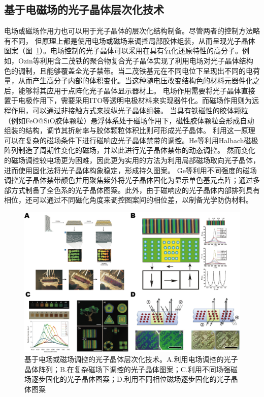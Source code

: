 \subsection{基于电磁场的光子晶体层次化技术}
\label{subsec:magnetelectro-pattern}

电场或磁场作用力也可以用于光子晶体的层次化结构制备。尽管两者的控制方法略有不同，
但原理上都是使用电场或磁场来调控局部胶体组装，从而呈现光子晶体图案（图~\ref{fig:magnet_electro_PhC}）。电场控制的光子晶体可以采用在具有氧化还原特性的高分子。例如，Ozin等利用含二茂铁的聚合物复合光子晶体实现了利用电场对光子晶体结构色的调制\cite{Arsenault2007PhotonicCrystal}，且能够覆盖全光子禁带。当二茂铁基元在不同电位下呈现出不同的电荷量，从而产生高分子内部的体积变化。当这种随电压改变结构色的材料元器件化之后，能够将其应用于点阵化光子晶体显示器材上。
电场作用需要将光子晶体直接置于电极作用下，需要采用ITO等透明电极材料来实现器件化。而磁场作用则为远程作用，可以通过非接触方式来操纵光子晶体组装。
当具有铁磁性的胶体颗粒（例如FeO@SiO胶体颗粒）悬浮体系处于磁场作用下，磁性胶体颗粒会形成自动组装的结构，调节其折射率与胶体颗粒体积比则可形成光子晶体\cite{Ge2009Magnetochromatic}。
利用这一原理可以在复杂的磁场条件下进行磁响应光子晶体禁带的调控。He等利用Halbach磁极阵列制造了周期性变化的磁场，并以此进行光子晶体禁带的动态调控\cite{He2011Assembly}。
然而变化的磁场调控较电场更为困难，因此更为实用的方法为利用局部磁场取向光子晶体，进而使用固化法将光子晶体构象稳定，形成持久图案。
Ge等利用不同强度的磁场调控光子晶体禁带颜色并用聚焦紫外将光子晶体固化为显示单色基元点阵；通过多部方式制备了全色系的光子晶体图案\cite{Kim2009Structural}。此外，由于磁响应的光子晶体内部排列具有相位，还可以通过不同磁化角度来调控图案间的相位差，以制备光学防伪材料\cite{Xuan2011Photonic}。
\begin{figure}[htbp]
	\centering
	\includegraphics[width=0.9\linewidth]{figures/magnet_electro_phC.png}
	\caption{基于电场或磁场调控的光子晶体层次化技术。A.利用电场调控的光子晶体阵列\cite{Arsenault2007PhotonicCrystal}；B.在复杂磁场下调控的光子晶体图案\cite{He2011Assembly}；C.利用不同场强磁场逐步固化的光子晶体图案\cite{Kim2009Structural}；D.利用不同相位磁场逐步固化的光子晶体图案\cite{Xuan2011Photonic}}
	\label{fig:magnet_electro_PhC}
\end{figure}

